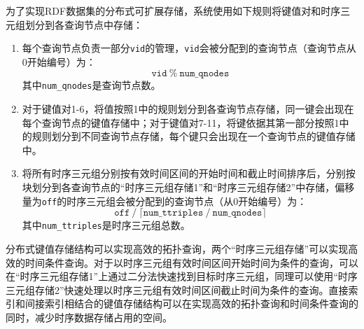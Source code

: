 \begin{figure}[!htb]
\label{trsdemo}
\end{figure}

为了实现RDF数据集的分布式可扩展存储，系统使用如下规则将键值对和时序三元组划分到各查询节点中存储：
\begin{enumerate}
    \item 每个查询节点负责一部分\texttt{vid}的管理，\texttt{vid}会被分配到的查询节点（查询节点从0开始编号）为：
    \begin{equation}
        \mathtt{vid \ \% \ num\_qnodes}
    \end{equation}
    其中\texttt{num\_qnodes}是查询节点数。
    \item 对于键值对1-6，将值按照1中的规则划分到各查询节点存储，同一键会出现在每个查询节点的键值存储中；对于键值对7-11，将键依据其第一部分按照1中的规则划分到不同查询节点存储，每个键只会出现在一个查询节点的键值存储中。
    \item 将所有时序三元组分别按有效时间区间的开始时间和截止时间排序后，分别按块划分到各查询节点的“时序三元组存储1”和“时序三元组存储2”中存储，偏移量为\texttt{off}的时序三元组会被分配到的查询节点（从0开始编号）为：
    \begin{equation}
        \mathtt{off \ / \ \lceil num\_ttriples \ / \ num\_qnodes \rceil}
    \end{equation}
    其中\texttt{num\_ttriples}是时序三元组总数。
\end{enumerate}

分布式键值存储结构可以实现高效的拓扑查询，两个“时序三元组存储”可以实现高效的时间条件查询。对于以时序三元组有效时间区间开始时间为条件的查询，可以在“时序三元组存储1”上通过二分法快速找到目标时序三元组，同理可以使用“时序三元组存储2”快速处理以时序三元组有效时间区间截止时间为条件的查询。直接索引和间接索引相结合的键值存储结构可以在实现高效的拓扑查询和时间条件查询的同时，减少时序数据存储占用的空间。

